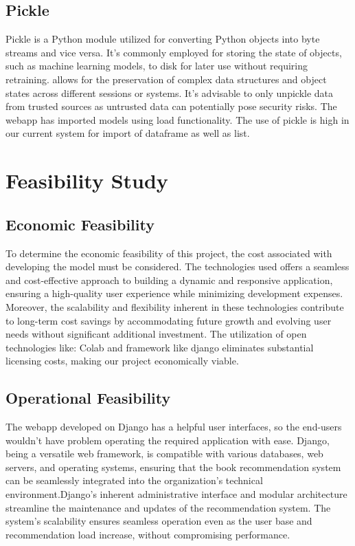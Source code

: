 \subsection*{Pickle}
Pickle is a Python module utilized for converting Python objects into byte streams and vice versa. It's commonly employed for storing the state of objects, such as machine learning models, to disk for later use without requiring retraining. allows for the preservation of complex data structures and object states across different sessions or systems. It's advisable to only unpickle data from trusted sources as untrusted data can potentially pose security risks. The webapp has imported models using load functionality. The use of pickle is high in our current system for import of dataframe as well as list. 

\section{Feasibility Study}

\subsection{Economic Feasibility}
To determine the economic feasibility of this project, the cost associated with developing the model must be considered. The technologies used offers a seamless and cost-effective
approach to building a dynamic and responsive application, ensuring a high-quality
user experience while minimizing development expenses. Moreover, the scalability and flexibility inherent in these technologies contribute to long-term cost savings by accommodating future growth and evolving user needs without significant additional investment. The utilization of open technologies like: Colab and framework like django eliminates substantial licensing costs, making our project economically viable.

\subsection{Operational Feasibility}
 The webapp developed on Django has a helpful user
interfaces, so the end-users wouldn’t have problem operating the required application
with ease. Django, being a versatile web framework, is compatible with various databases, web servers, and operating systems, ensuring that the book recommendation system can be seamlessly integrated into the organization's technical environment.Django's inherent administrative interface and modular architecture streamline the maintenance and updates of the recommendation system. The system's scalability ensures seamless operation even as the user base and recommendation load increase, without compromising performance.

